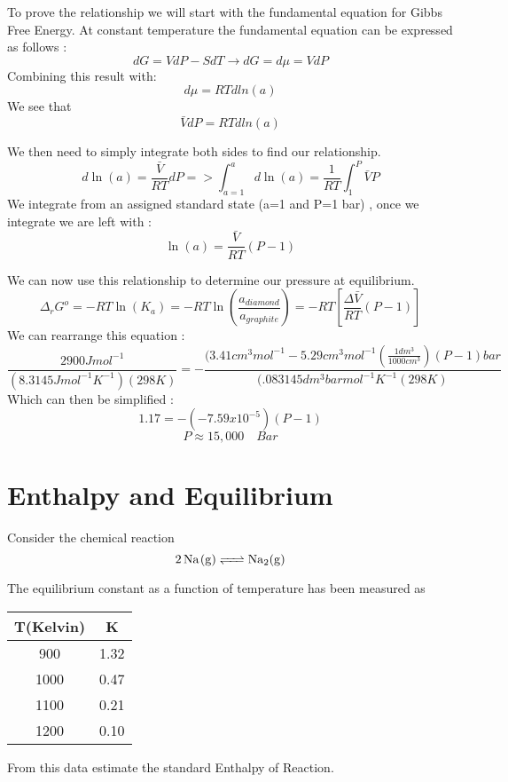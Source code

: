 \documentclass{article}
\newcommand{\be}{\begin{equation}}
\newcommand{\ee}{\end{equation}}
\begin{document}
To prove the relationship we will start with the fundamental equation for Gibbs Free Energy. 
At constant temperature the fundamental equation can be expressed as follows : 
\be
dG = VdP - SdT \rightarrow dG = d\mu = VdP
\ee
Combining this result with: 
\be
d\mu = RTdln(a) 
\ee
We see that 
\be
\bar V dP = RTdln(a) 
\ee

We then need to simply integrate both sides to find our relationship.
\be
d\ln(a) = \frac{\bar V}{RT}dP => \int^{a}_{a=1} d\ln(a) = \frac{1}{RT} \int^{P}_{1} \bar V P 
\ee
We integrate from an assigned standard state (a=1 and P=1 bar) , once we integrate we are left with : 
\be
\ln(a) =  \frac{\bar V}{RT}(P-1)
\ee

We can now use this relationship to determine our pressure at equilibrium. 
\be
\Delta_rG^o = -RT\ln(K_a) = -RT\ln\left( \frac{a_{diamond}}{a_{graphite}}\right) = -RT\left[\frac{\Delta \bar V}{RT}(P-1)\right]
\ee
We can rearrange this equation : 
\be
\frac{2900 Jmol^{-1}}{(8.3145 Jmol^{-1}K^{-1})(298 K)} = - \frac{(3.41cm^3mol^{-1} - 5.29 cm^3mol^{-1}(\frac{1dm^3}{1000cm^3})(P-1)bar}{(.083145dm^3barmol^{-1}K^{-1}(298K)}
\ee 
Which can then be simplified : 
\be
1.17 = - (-7.59 x 10^{-5})(P-1) 
\ee
\be
P \approx 15,000 \quad Bar 
\ee

\section{Enthalpy and Equilibrium}
Consider the chemical reaction
\be
\ce{2 Na(g) <=> Na2(g)}
\ee

The equilibrium constant as a function of temperature has been measured as

\begin{center}
 \begin{tabular}{|c | c |} 
 \hline
 T(Kelvin) & K   \\ 
 \hline
 900 & 1.32   \\
 \hline
 1000 & 0.47  \\
 \hline
 1100 & 0.21  \\
 \hline
 1200 & 0.10   \\  
 \hline
\end{tabular}
\end{center}

From this data estimate the standard Enthalpy of Reaction. 
\end{document}
